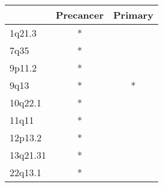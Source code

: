 \begin{tabular}{lcc}
\toprule
{} & Precancer & Primary \\
\midrule
1q21.3   &         * &         \\
7q35     &         * &         \\
9p11.2   &         * &         \\
9q13     &         * &       * \\
10q22.1  &         * &         \\
11q11    &         * &         \\
12p13.2  &         * &         \\
13q21.31 &         * &         \\
22q13.1  &         * &         \\
\bottomrule
\end{tabular}
